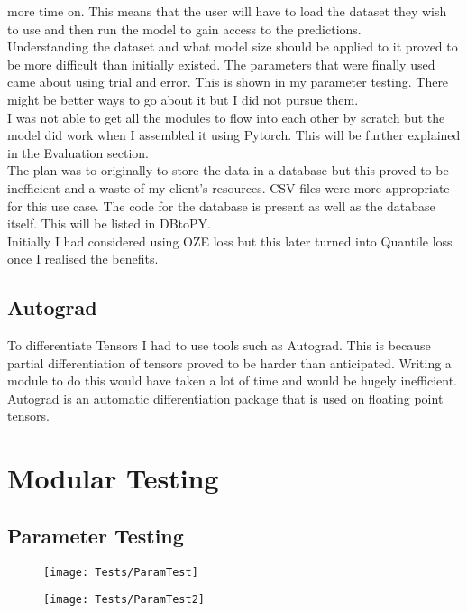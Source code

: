 \documentclass{article}
\begin{document}
more time on. This means that the user will have to load the dataset they wish
to use and then run the model to gain access to the predictions.\\
Understanding the dataset and what model size should be applied to it proved
to be more difficult than initially existed. The parameters that were finally used
came about using trial and error. This is shown in my parameter testing. There
might be better ways to go about it but I did not pursue them.\\
I was not able to get all the modules to flow into each other by scratch but
the model did work when I assembled it using Pytorch. This will be further
explained in the Evaluation section.\\
The plan was to originally to store the data in a database but this proved to be
inefficient and a waste of my client's resources. CSV files were more appropriate
for this use case. The code for the database is present as well as the database itself.
This will be listed in DBtoPY.\\
Initially I had considered using OZE loss but this later turned into Quantile loss
once I realised the benefits.
\subsection{Autograd}
To differentiate Tensors I had to use tools such as Autograd. This is because
partial differentiation of tensors proved to be harder than anticipated. Writing
a module to do this would have taken a lot of time and would be hugely inefficient.
Autograd is an automatic differentiation package that is used on floating point
tensors.
\clearpage
\section{Modular Testing}


\subsection{Parameter Testing}

\begin{figure}[H]
    \centering
    \texttt{[image: Tests/ParamTest]}
\end{figure}

\begin{figure}[H]
    \centering
    \texttt{[image: Tests/ParamTest2]}
\end{figure}
\end{document}

